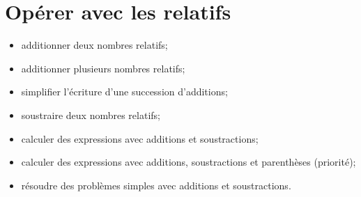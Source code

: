 \chapter{Opérer avec les relatifs}\label{ChOpererRelatifs}


\vspace{5cm}

\begin{acquis}
\begin{itemize}
\item additionner deux nombres relatifs;
\item additionner plusieurs nombres relatifs;
\item simplifier l’écriture d’une succession d’additions;
\item soustraire deux nombres relatifs;
\item calculer des expressions avec additions et soustractions;
\item calculer des expressions avec additions, soustractions et parenthèses (priorité);
\item résoudre des problèmes simples avec additions et soustractions.
\end{itemize}
\end{acquis}


\activites




\exercicesbase
\begin{colonne*exercice}

\end{colonne*exercice}


\exercicesappr
\begin{colonne*exercice}

\end{colonne*exercice}

\connaissances


%

\pagebreak

%



